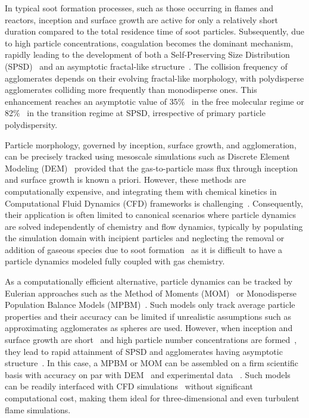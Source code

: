 In typical soot formation processes, such as those occurring in flames and reactors, inception and surface growth are active for only a relatively short duration compared to the total residence time of soot particles. Subsequently, due to high particle concentrations, coagulation becomes the dominant mechanism, rapidly leading to the development of both a Self-Preserving Size Distribution (SPSD)~\citep{lai1972self} and an asymptotic fractal-like structure~\citep{mountain1986simulation, Goudeli2016}.
The collision frequency of agglomerates depends on their evolving fractal-like morphology, with polydisperse agglomerates colliding more frequently than monodisperse ones. This enhancement reaches an asymptotic value of 35$\%$~\citep{Goudeli2016} in the free molecular regime or 82$\%$~\citep{kelesidis2021self} in the transition regime at SPSD, irrespective of primary particle polydispersity.

Particle morphology, governed by inception, surface growth, and agglomeration, can be precisely tracked using mesoscale simulations such as Discrete Element Modeling (DEM)~\citep{Kelesidis2017Flame} provided that the gas-to-particle mass flux through inception and surface growth is known a priori. However, these methods are computationally expensive, and integrating them with chemical kinetics in Computational Fluid Dynamics (CFD) frameworks is challenging~\citep{kelesidis2021perspective}. Consequently, their application is often limited to canonical scenarios where particle dynamics are solved independently of chemistry and flow dynamics, typically by populating the simulation domain with incipient particles and neglecting the removal or addition of gaseous species due to soot formation~\citep{Kelesidis2017} as it is difficult to have a particle dynamics modeled fully coupled with gas chemistry. 

As a computationally efficient alternative, particle dynamics can be tracked by Eulerian approaches such as the Method of Moments (MOM)~\citep{kazakov1998dynamic} or Monodisperse Population Balance Models (MPBM)~\citep{kruis1993simple}. Such models only track average particle properties and their accuracy can be limited if unrealistic assumptions such as approximating agglomerates as spheres are used. However, when inception and surface growth are short~\citep{Spicer2002} and high particle number concentrations are formed~\cite{Kelesidis2017}, they lead to rapid attainment of SPSD and agglomerates having asymptotic structure~\citep{Goudeli2016}. In this case, a MPBM or MOM can be assembled on a firm scientific basis with accuracy on par with DEM~\citep{Kelesidis2017Flame} and experimental data ~\citep{abid2008evolution, ma2013soot, camacho2015mobility}. Such models can be readily interfaced with CFD simulations~\citep{grohn2012fluid} without significant computational cost, making them ideal for three-dimensional and even turbulent flame simulations.

